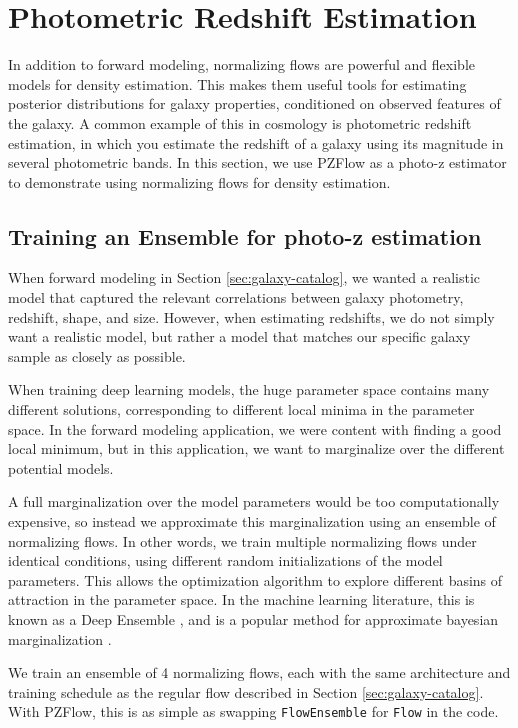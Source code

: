 \documentclass[twocolumn,twocolappendix,linenumbers]{aastex631}
\begin{document}
\section{Photometric Redshift Estimation}
\label{sec:photo-z}

In addition to forward modeling, normalizing flows are powerful and flexible models for density estimation.
This makes them useful tools for estimating posterior distributions for galaxy properties, conditioned on observed features of the galaxy.
A common example of this in cosmology is photometric redshift estimation, in which you estimate the redshift of a galaxy using its magnitude in several photometric bands.
In this section, we use PZFlow as a photo-z estimator to demonstrate using normalizing flows for density estimation.

\subsection{Training an Ensemble for photo-z estimation}

When forward modeling in Section \ref{sec:galaxy-catalog}, we wanted a realistic model that captured the relevant correlations between galaxy photometry, redshift, shape, and size.
However, when estimating redshifts, we do not simply want a realistic model, but rather a model that matches our specific galaxy sample as closely as possible.

When training deep learning models, the huge parameter space contains many different solutions, corresponding to different local minima in the parameter space.
In the forward modeling application, we were content with finding a good local minimum, but in this application, we want to marginalize over the different potential models.

A full marginalization over the model parameters would be too computationally expensive, so instead we approximate this marginalization using an ensemble of normalizing flows.
In other words, we train multiple normalizing flows under identical conditions, using different random initializations of the model parameters.
This allows the optimization algorithm to explore different basins of attraction in the parameter space.
In the machine learning literature, this is known as a Deep Ensemble \citep{lakshminarayanan2017}, and is a popular method for approximate bayesian marginalization \citep{wilson2020,fort2020}.

We train an ensemble of 4 normalizing flows, each with the same architecture and training schedule as the regular flow described in Section \ref{sec:galaxy-catalog}.
With PZFlow, this is as simple as swapping \texttt{FlowEnsemble} for \texttt{Flow} in the code.
\end{document}
